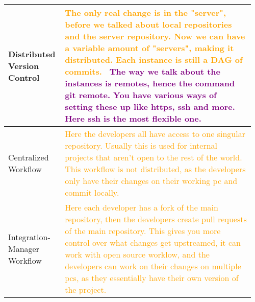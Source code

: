 \documentclass[main.tex,fontsize=8pt,paper=a4,paper=portrait,DIV=calc,]{scrartcl}
\begin{document}
\begin{table}[ht!]
\begin{tabular}{|m{0.2\linewidth}|m{0.755\linewidth}|}
\hline
Distributed Version Control &
\textcolor{orange}{The only real change is in the "server", before we talked about local repositories and the server repository. \newline
Now we can have a variable amount of "servers", making it distributed. \newline
Each instance is still a \textbf{DAG of commits}.}\newline
\, \newline
\textcolor{purple}{The way we talk about the instances is \textbf{remotes}, hence the command git remote.\newline
You have various ways of setting these up like https, ssh and more. Here ssh is the most flexible one.}\\
\hline
Centralized Workflow & 
\textcolor{orange}{Here the developers all have access to one singular repository. Usually this is used for internal projects that aren't open to the rest of the world.\newline
This workflow is not distributed, as the developers only have their changes on their working pc and commit locally.}\\
\hline
Integration-Manager Workflow & 
\textcolor{orange}{Here each developer has a fork of the main repository, then the developers create pull requests of the main repository.\newline
This gives you more control over what changes get upstreamed, it can work with open source worklow, and the developers can work on their changes on multiple pcs, as they essentially have their own version of the project.}\\
\hline
\end{tabular}
\end{table}
\pagebreak
\end{document}
